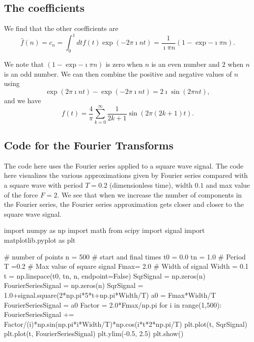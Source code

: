 \documentclass[%
oneside,                 %
final,                   %
10pt]{article}
\begin{document}
\subsection{The coefficients}

We find that the other coefficients are
\[
\hat{f}(n)=c_n=\int_0^1 dt f(t)\exp{(-2\pi\imath nt)}=\frac{1}{\imath\pi n}\left(1-\exp{-\imath\pi n}\right).
\]

We note that $(1-\exp{-\imath\pi n})$ is zero when $n$ is an even
number and $2$ when $n$ is an odd number. We can then combine the
positive and negative values of $n$ using
\[
\exp{(2\pi\imath nt)}-\exp{(-2\pi\imath nt)}=2\imath \sin{(2\pi nt)},
\]
and we have
\[
f(t)=\frac{4}{\pi}\sum_{k=0}^{\infty}\frac{1}{2k+1}\sin{(2\pi(2k+1)t)}.
\]

\subsection{Code for the  Fourier Transforms}

The code here uses the Fourier series applied to a 
square wave signal. The code here
visualizes the various approximations given by Fourier series compared
with a square wave with period $T=0.2$ (dimensionless time), width $0.1$ and max value of the force $F=2$. We
see that when we increase the number of components in the Fourier
series, the Fourier series approximation gets closer and closer to the
square wave signal.































\bpycod
import numpy as np
import math
from scipy import signal
import matplotlib.pyplot as plt

# number of points                                                                                       
n = 500
# start and final times                                                                                  
t0 = 0.0
tn = 1.0
# Period                                                                                                 
T =0.2
# Max value of square signal                                                                             
Fmax= 2.0
# Width of signal   
Width = 0.1
t = np.linspace(t0, tn, n, endpoint=False)
SqrSignal = np.zeros(n)
FourierSeriesSignal = np.zeros(n)
SqrSignal = 1.0+signal.square(2*np.pi*5*t+np.pi*Width/T)
a0 = Fmax*Width/T
FourierSeriesSignal = a0
Factor = 2.0*Fmax/np.pi
for i in range(1,500):
    FourierSeriesSignal += Factor/(i)*np.sin(np.pi*i*Width/T)*np.cos(i*t*2*np.pi/T)
plt.plot(t, SqrSignal)
plt.plot(t, FourierSeriesSignal)
plt.ylim(-0.5, 2.5)
plt.show()
\end{document}
